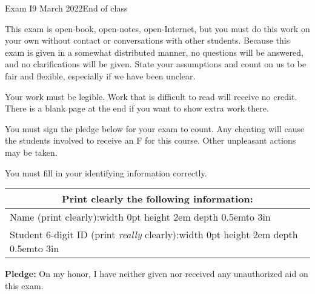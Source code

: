 \documentclass[12pt]{article}
\def\Tall{\vrule width 0pt height 2em depth 0.5em}
\begin{document}
\begin{assignment}{Exam I}{9 March 2022}{End of class}

{\small {\large {}}
This exam is open-book, open-notes, open-Internet, but you must do this
work on your own without contact or conversations with other students.
Because this exam is given in a somewhat distributed manner, no questions will be answered, and no clarifications will be given.  State your assumptions and count on us to be fair and flexible, especially if we have been unclear.


Your work must be legible.  Work that is
difficult to read will receive no credit.  There is a blank page at the end
if you want to show extra work there.

You must sign the pledge below for your exam to count.  Any cheating will
cause the students involved to receive an F for this course. Other unpleasant
actions
may be taken.

You must fill in your identifying information correctly.  
}

\begin{center}\large
\begin{tabular}{|c|c|c|} \hline
\multicolumn{3}{|c|}{{\bf Print  clearly} the following information:}  \\ \hline
\multicolumn{3}{|l|}{Name (print clearly):\Tall{}\hbox to 3in{\hss}}  \\ \hline
\multicolumn{3}{|l|}{Student 6-digit ID (print {\it really} clearly):\Tall{}\hbox to 3in{\hss}} \\ \hline
\end{tabular}
\end{center}

{\bf Pledge:} On my honor, I have neither
given nor received any unauthorized aid on this exam.


\end{assignment}
\end{document}
